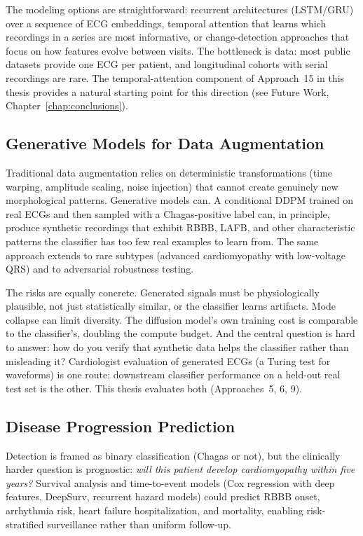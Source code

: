 The modeling options are straightforward: recurrent architectures (LSTM/GRU) over a sequence of ECG embeddings, temporal attention that learns which recordings in a series are most informative, or change-detection approaches that focus on how features evolve between visits. The bottleneck is data: most public datasets provide one ECG per patient, and longitudinal cohorts with serial recordings are rare. The temporal-attention component of Approach~15 in this thesis provides a natural starting point for this direction (see Future Work, Chapter~\ref{chap:conclusions}).

\subsection{Generative Models for Data Augmentation}

Traditional data augmentation relies on deterministic transformations (time warping, amplitude scaling, noise injection) that cannot create genuinely new morphological patterns. Generative models can. A conditional DDPM trained on real ECGs and then sampled with a Chagas-positive label can, in principle, produce synthetic recordings that exhibit RBBB, LAFB, and other characteristic patterns the classifier has too few real examples to learn from. The same approach extends to rare subtypes (advanced cardiomyopathy with low-voltage QRS) and to adversarial robustness testing.

The risks are equally concrete. Generated signals must be physiologically plausible, not just statistically similar, or the classifier learns artifacts. Mode collapse can limit diversity. The diffusion model's own training cost is comparable to the classifier's, doubling the compute budget. And the central question is hard to answer: how do you verify that synthetic data helps the classifier rather than misleading it? Cardiologist evaluation of generated ECGs (a Turing test for waveforms) is one route; downstream classifier performance on a held-out real test set is the other. This thesis evaluates both (Approaches~5, 6, 9).

\subsection{Disease Progression Prediction}

Detection is framed as binary classification (Chagas or not), but the clinically harder question is prognostic: \textit{will this patient develop cardiomyopathy within five years?} Survival analysis and time-to-event models (Cox regression with deep features, DeepSurv, recurrent hazard models) could predict RBBB onset, arrhythmia risk, heart failure hospitalization, and mortality, enabling risk-stratified surveillance rather than uniform follow-up.


